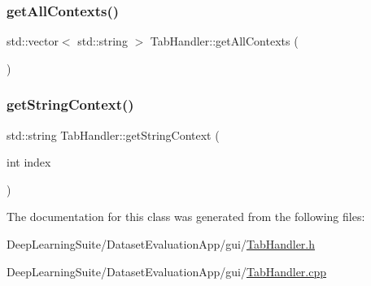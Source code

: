 \subsubsection{\texorpdfstring{get\+All\+Contexts()}{getAllContexts()}}
{\footnotesize\ttfamily std\+::vector$<$ std\+::string $>$ Tab\+Handler\+::get\+All\+Contexts (\begin{DoxyParamCaption}{ }\end{DoxyParamCaption})}

\mbox{\label{class_tab_handler_afcefa94c308a90bba358dd371fa3c39b}} 
\subsubsection{\texorpdfstring{get\+String\+Context()}{getStringContext()}}
{\footnotesize\ttfamily std\+::string Tab\+Handler\+::get\+String\+Context (\begin{DoxyParamCaption}\item[{int}]{index }\end{DoxyParamCaption})}



The documentation for this class was generated from the following files\+:\begin{DoxyCompactItemize}
\item 
Deep\+Learning\+Suite/\+Dataset\+Evaluation\+App/gui/\hyperlink{_tab_handler_8h}{Tab\+Handler.\+h}\item 
Deep\+Learning\+Suite/\+Dataset\+Evaluation\+App/gui/\hyperlink{_tab_handler_8cpp}{Tab\+Handler.\+cpp}\end{DoxyCompactItemize}
